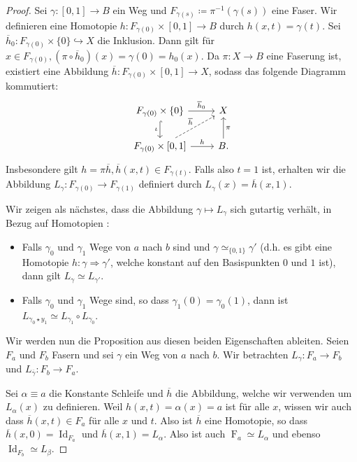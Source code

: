 \documentclass[12pt, hidelinks]{article}
\numberwithin{conj}{section}
\begin{document}
\begin{proof}
Sei $\gamma: [0,1] \to B$ ein Weg und $F_{\gamma(s)} \coloneq \pi^{-1}(\gamma(s))$ eine Faser. Wir definieren eine Homotopie $h: F_{\gamma(0)} \times [0,1] \to B$ durch $h(x,t) = \gamma(t)$. Sei $\overline{h}_0: F_{\gamma(0)} \times \{0\} \hookrightarrow X$ die Inklusion. Dann gilt für $x \in F_{\gamma(0)}, (\pi \circ \overline{h}_0)(x) = \gamma(0) = h_0(x)$. Da $\pi: X \to B$ eine Faserung ist, existiert eine Abbildung $\overline{h}: F_{\gamma(0)} \times [0,1] \to X$, sodass das folgende Diagramm kommutiert:
\[\begin{tikzcd}
    {F_{\gamma(0)} \times \{0\}} & X \\
    {F_{\gamma(0)}\times[0,1]} & B.
    \arrow["{\overline{h}_0}", from=1-1, to=1-2]
    \arrow["\iota"', hook, from=1-1, to=2-1]
    \arrow["{\overline{h}}", dashed, from=2-1, to=1-2]
    \arrow["h", from=2-1, to=2-2]
    \arrow["\pi"', from=2-2, to=1-2]
\end{tikzcd}\]
Insbesondere gilt $h = \pi \overline{h}, \overline{h}(x,t) \in F_{\gamma(t)}$. Falls also $t=1$ ist, erhalten wir die Abbildung $L_\gamma: F_{\gamma(0)} \to F_{\gamma(1)}$ definiert durch $L_\gamma(x) = \overline{h}(x,1)$.

Wir zeigen als nächstes, dass die Abbildung $\gamma \mapsto L_\gamma$ sich gutartig verhält, in Bezug auf Homotopien \cite[Prop. 4.61]{hatcher2001}:
\begin{itemize}[noitemsep]
    \item Falls $\gamma_0$ und $\gamma_1$ Wege von $a$ nach $b$ sind und $\gamma \simeq_{\{0,1\}} \gamma'$ (d.h. es gibt eine Homotopie $h: \gamma \Rightarrow \gamma'$, welche konstant auf den Basispunkten $0$ und $1$ ist), dann gilt $L_\gamma \simeq L_{\gamma'}$.
    \item Falls $\gamma_0$ und $\gamma_1$ Wege sind, so dass $\gamma_1(0) = \gamma_0(1)$, dann ist $L_{\gamma_0 \star y_1} \simeq L_{\gamma_1} \circ L_{\gamma_0}$.
\end{itemize}
Wir werden nun die Proposition aus diesen beiden Eigenschaften ableiten. Seien $F_a$ und $F_b$ Fasern und sei $\gamma$ ein Weg von $a$ nach $b$. Wir betrachten $L_\gamma: F_a \to F_b$ und $L_{\overline{\gamma}}: F_b \to F_a$.

Sei $\alpha \equiv a$ die Konstante Schleife und $\overline{h}$ die Abbildung, welche wir verwenden um $L_\alpha(x)$ zu definieren. Weil $h(x,t) = \alpha(x) = a$ ist für alle $x$, wissen wir auch dass $\overline{h}(x,t) \in F_a$ für alle $x$ und $t$. Also ist $\overline{h}$ eine Homotopie, so dass $\overline{h}(x,0) = \operatorname{Id}_{F_a}$ und $\overline{h}(x,1) = L_\alpha$. Also ist auch $\operatorname{F}_a \simeq L_\alpha$ und ebenso $\operatorname{Id}_{F_b} \simeq L_\beta$.


\end{proof}
\end{document}
